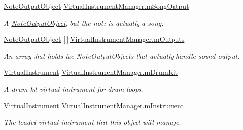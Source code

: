 \begin{DoxyCompactItemize}
\mbox{\label{group___virtual_instrument_manager_event_types_gaa8d4f5642f5ac4dca4f4178b0052c78d}} 
\hyperlink{class_note_output_object}{Note\+Output\+Object} \hyperlink{group___virtual_instrument_manager_event_types_gaa8d4f5642f5ac4dca4f4178b0052c78d}{Virtual\+Instrument\+Manager.\+m\+Song\+Output}
\begin{DoxyCompactList}\small\item\em A \hyperlink{class_note_output_object}{Note\+Output\+Object}, but the note is actually a song. \end{DoxyCompactList}\item 
\mbox{\label{group___virtual_instrument_manager_event_types_ga53f837fd01475fa35629a650e7fa00e3}} 
\hyperlink{class_note_output_object}{Note\+Output\+Object} \mbox{[}$\,$\mbox{]} \hyperlink{group___virtual_instrument_manager_event_types_ga53f837fd01475fa35629a650e7fa00e3}{Virtual\+Instrument\+Manager.\+m\+Outputs}
\begin{DoxyCompactList}\small\item\em An array that holds the Note\+Output\+Objects that actually handle sound output. \end{DoxyCompactList}\item 
\mbox{\label{group___virtual_instrument_manager_event_types_ga0bc7c9f776b0d2dae0ccb1f1ee5f2143}} 
\hyperlink{class_virtual_instrument}{Virtual\+Instrument} \hyperlink{group___virtual_instrument_manager_event_types_ga0bc7c9f776b0d2dae0ccb1f1ee5f2143}{Virtual\+Instrument\+Manager.\+m\+Drum\+Kit}
\begin{DoxyCompactList}\small\item\em A drum kit virtual instrument for drum loops. \end{DoxyCompactList}\item 
\mbox{\label{group___virtual_instrument_manager_event_types_gaed435d1f9be09864846db4322dc21fd1}} 
\hyperlink{class_virtual_instrument}{Virtual\+Instrument} \hyperlink{group___virtual_instrument_manager_event_types_gaed435d1f9be09864846db4322dc21fd1}{Virtual\+Instrument\+Manager.\+m\+Instrument}
\begin{DoxyCompactList}\small\item\em The loaded virtual instrument that this object will manage. \end{DoxyCompactList}\end{DoxyCompactItemize}
